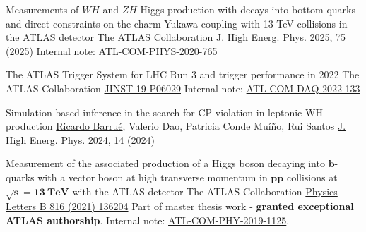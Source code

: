 


\begin{cventries}

    \cventry
    {Measurements of $WH$ and $ZH$ Higgs production with decays into bottom quarks and direct constraints on the charm Yukawa coupling with 13 TeV collisions in the ATLAS detector}
    {The ATLAS Collaboration}{}
    {\href{https://doi.org/10.1007/JHEP04(2025)075}{J. High Energ. Phys. 2025, 75 (2025)}}
    {
        Internal note: \href{https://cds.cern.ch/record/2743096}{ATL-COM-PHYS-2020-765}
    }

    \cventry
    {The ATLAS Trigger System for LHC Run 3 and trigger performance in 2022}
    {The ATLAS Collaboration}
    {}
    {\href{https://doi.org/10.1088/1748-0221/19/06/P06029}{JINST 19 P06029}}
    {
        Internal note: \href{https://cds.cern.ch/record/2845056}{ATL-COM-DAQ-2022-133}
    }

    \cventry
    {Simulation-based inference in the search for CP violation in leptonic WH production}
    {\underline{Ricardo Barrué}, Valerio Dao, Patricia Conde Muíño, Rui Santos}
    {}
    {\href{https://doi.org/10.1007/JHEP04(2024)014}{J. High Energ. Phys. 2024, 14 (2024)}}
    {
    }

    \cventry
    {Measurement of the associated production of a Higgs boson decaying into $\mathbf{b}$-quarks with a vector boson at high transverse momentum in $\mathbf{pp}$ collisions at $\mathbf{\sqrt{s}= 13 \:\text{TeV}}$ with the ATLAS detector}
    {The ATLAS Collaboration}
    {}
    {\href{https://doi.org/10.1016/j.physletb.2021.136204}{Physics Letters B 816 (2021) 136204}}
    {
        Part of master thesis work - \textbf{granted exceptional ATLAS authorship}. Internal note: \href{https://cds.cern.ch/record/2688371}{ATL-COM-PHY-2019-1125}.
    }
    
\end{cventries}

